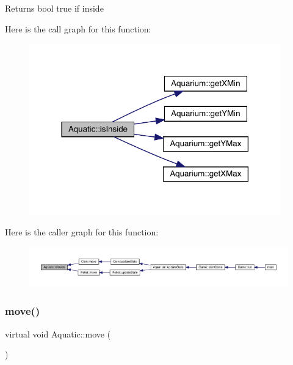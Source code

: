 \begin{DoxyReturn}{Returns}
bool true if inside 
\end{DoxyReturn}
Here is the call graph for this function\+:\nopagebreak
\begin{figure}[H]
\begin{center}
\leavevmode
\includegraphics[width=309pt]{class_aquatic_a2c438132d8b625d3c2187ff5735193a0_cgraph}
\end{center}
\end{figure}
Here is the caller graph for this function\+:\nopagebreak
\begin{figure}[H]
\begin{center}
\leavevmode
\includegraphics[width=350pt]{class_aquatic_a2c438132d8b625d3c2187ff5735193a0_icgraph}
\end{center}
\end{figure}
\mbox{\label{class_aquatic_a962e93c804814eeaf3cea6e26698eef7}} 
\subsubsection{\texorpdfstring{move()}{move()}}
{\footnotesize\ttfamily virtual void Aquatic\+::move (\begin{DoxyParamCaption}{ }\end{DoxyParamCaption})\hspace{0.3cm}{\ttfamily [pure virtual]}}



